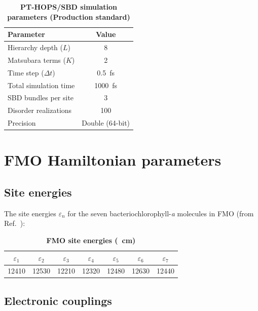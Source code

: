 \documentclass[11pt,a4paper]{article}
\begin{document}
\begin{table}[htb]
\centering
\caption{\textbf{PT-HOPS/SBD simulation parameters (Production standard)}}
\label{tab:SI_parameters}
\begin{tabular}{lc}
\toprule
\textbf{Parameter} & \textbf{Value} \\
\midrule
Hierarchy depth ($L$) & 8 \\
Matsubara terms ($K$) & 2 \\
Time step ($\Delta t$) & \SI{0.5}{\femto\second} \\
Total simulation time & \SI{1000}{\femto\second} \\
SBD bundles per site & 3 \\
Disorder realizations & 100 \\
Precision & Double (64-bit) \\
\bottomrule
\end{tabular}
\end{table}



\section{FMO Hamiltonian parameters}
\label{sec:S2}

\subsection{Site energies}

The site energies $\varepsilon_n$ for the seven bacteriochlorophyll-\textit{a} molecules in FMO (from Ref.\ \cite{Adolphs2006}):

\begin{table}[htb]
\centering
\caption{\textbf{FMO site energies (\si{\per\centi\meter})}}
\label{tab:SI_site_energies}
\begin{tabular}{ccccccc}
\toprule
$\varepsilon_1$ & $\varepsilon_2$ & $\varepsilon_3$ & $\varepsilon_4$ & $\varepsilon_5$ & $\varepsilon_6$ & $\varepsilon_7$ \\
\midrule
12410 & 12530 & 12210 & 12320 & 12480 & 12630 & 12440 \\
\bottomrule
\end{tabular}
\end{table}

\subsection{Electronic couplings}
\end{document}
